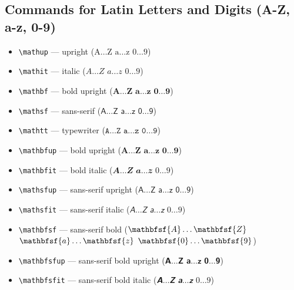 \documentclass[12pt,a4paper]{article}
\begin{document}
\subsection*{Commands for Latin Letters and Digits (A-Z, a-z, 0-9)}

\begin{itemize}
    \item \texttt{\textbackslash{}mathup} --- upright ($\mathup{A} \ldots \mathup{Z}$ $\mathup{a} \ldots \mathup{z}$ $\mathup{0} \ldots \mathup{9}$)
    \item \texttt{\textbackslash{}mathit} --- italic ($\mathit{A} \ldots \mathit{Z}$ $\mathit{a} \ldots \mathit{z}$ $\mathit{0} \ldots \mathit{9}$)
    \item \texttt{\textbackslash{}mathbf} --- bold upright ($\mathbf{A} \ldots \mathbf{Z}$ $\mathbf{a} \ldots \mathbf{z}$ $\mathbf{0} \ldots \mathbf{9}$)
    \item \texttt{\textbackslash{}mathsf} --- sans-serif ($\mathsf{A} \ldots \mathsf{Z}$ $\mathsf{a} \ldots \mathsf{z}$ $\mathsf{0} \ldots \mathsf{9}$)
    \item \texttt{\textbackslash{}mathtt} --- typewriter ($\mathtt{A} \ldots \mathtt{Z}$ $\mathtt{a} \ldots \mathtt{z}$ $\mathtt{0} \ldots \mathtt{9}$)
    \item \texttt{\textbackslash{}mathbfup} --- bold upright ($\mathbfup{A} \ldots \mathbfup{Z}$ $\mathbfup{a} \ldots \mathbfup{z}$ $\mathbfup{0} \ldots \mathbfup{9}$)
    \item \texttt{\textbackslash{}mathbfit} --- bold italic ($\mathbfit{A} \ldots \mathbfit{Z}$ $\mathbfit{a} \ldots \mathbfit{z}$ $\mathbfit{0} \ldots \mathbfit{9}$)
    \item \texttt{\textbackslash{}mathsfup} --- sans-serif upright ($\mathsfup{A} \ldots \mathsfup{Z}$ $\mathsfup{a} \ldots \mathsfup{z}$ $\mathsfup{0} \ldots \mathsfup{9}$)
    \item \texttt{\textbackslash{}mathsfit} --- sans-serif italic ($\mathsfit{A} \ldots \mathsfit{Z}$ $\mathsfit{a} \ldots \mathsfit{z}$ $\mathsfit{0} \ldots \mathsfit{9}$)
    \item \texttt{\textbackslash{}mathbfsf} --- sans-serif bold ($\mathbfsf{A} \ldots \mathbfsf{Z}$ $\mathbfsf{a} \ldots \mathbfsf{z}$ $\mathbfsf{0} \ldots \mathbfsf{9}$)
    \item \texttt{\textbackslash{}mathbfsfup} --- sans-serif bold upright ($\mathbfsfup{A} \ldots \mathbfsfup{Z}$ $\mathbfsfup{a} \ldots \mathbfsfup{z}$ $\mathbfsfup{0} \ldots \mathbfsfup{9}$)
    \item \texttt{\textbackslash{}mathbfsfit} --- sans-serif bold italic ($\mathbfsfit{A} \ldots \mathbfsfit{Z}$ $\mathbfsfit{a} \ldots \mathbfsfit{z}$ $\mathbfsfit{0} \ldots \mathbfsfit{9}$)

\end{itemize}
\end{document}
